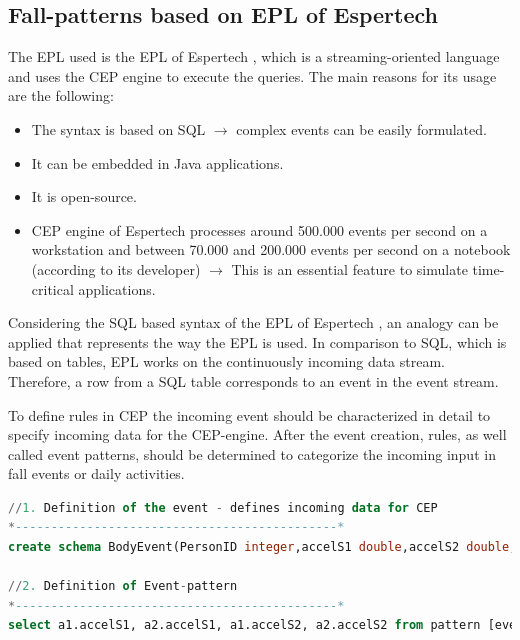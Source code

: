 \documentclass[10pt,journal,compsoc]{IEEEtran}
\begin{document}
\subsection{Fall-patterns based on EPL of Espertech}
\label{subsec:CEP}
The EPL used is the EPL of Espertech \cite{Esper:2016}, which is a streaming-oriented language and uses the CEP engine to execute the queries. The main reasons for its usage are the following:
\begin{itemize}
	\item The syntax is based on SQL $\rightarrow$ complex events can be easily formulated.
	\item It can be embedded in Java applications.
	\item It is open-source.
	\item CEP engine of Espertech processes around 500.000 events per second on a workstation and between 70.000 and 200.000 events per second on a notebook (according to its developer) $\rightarrow$ This is an essential feature to simulate time-critical applications. 
\end{itemize}
Considering the SQL based syntax of the EPL of Espertech \cite{Esper:2016}, an analogy can be applied that represents the way the EPL is used. In comparison to SQL, which is based on tables, EPL works on the continuously incoming data stream. Therefore, a row from a SQL table corresponds to an event in the event stream. 

To define rules in CEP the incoming event should be characterized in detail to specify incoming data for the CEP-engine. After the event creation, rules, as well called event patterns, should be determined to categorize the incoming input in fall events or daily activities.
\renewcommand{\lstlistingname}{Example}
\begin{lstlisting}[basicstyle=\ttfamily\footnotesize,language=SQL,caption=Fall pattern based on Kozina et al. \cite{Kozina},label=CEPPattern, breaklines=true]
//1. Definition of the event - defines incoming data for CEP
*---------------------------------------------*
create schema BodyEvent(PersonID integer,accelS1 double,accelS2 double,timestamp string)

//2. Definition of Event-pattern
*---------------------------------------------*
select a1.accelS1, a2.accelS1, a1.accelS2, a2.accelS2 from pattern [every(a1=BodyEvent(a1.accelS1 <= 9.81) -> a2=BodyEvent(a2.accelS1-a1.accelS1 >= 9.81 and a1.PersonID = a2.PersonID) where timer:within(1sec)) or every (a1=BodyEvent(a1.accelS2 <= 9.81)-> a2=BodyEvent(a2.accelS2-a1.accelS2 >= 9.81 and a1.PersonID = a2.PersonID) where timer:within(1sec))];
\end{lstlisting}
\end{document}

